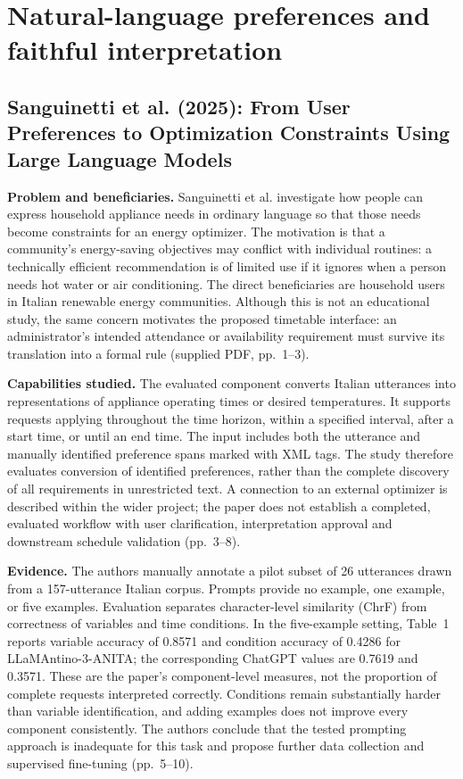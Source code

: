\documentclass[
  11pt,a4paper,oneside]{report}
\begin{document}
\section{Natural-language preferences and faithful interpretation}
\subsection{Sanguinetti et al. (2025): From User Preferences to Optimization Constraints Using Large Language Models}
\textbf{Problem and beneficiaries.} Sanguinetti et al. investigate how people can express household appliance needs in ordinary language so that those needs become constraints for an energy optimizer. The motivation is that a community's energy-saving objectives may conflict with individual routines: a technically efficient recommendation is of limited use if it ignores when a person needs hot water or air conditioning. The direct beneficiaries are household users in Italian renewable energy communities. Although this is not an educational study, the same concern motivates the proposed timetable interface: an administrator's intended attendance or availability requirement must survive its translation into a formal rule (supplied PDF, pp.~1--3).

\textbf{Capabilities studied.} The evaluated component converts Italian utterances into representations of appliance operating times or desired temperatures. It supports requests applying throughout the time horizon, within a specified interval, after a start time, or until an end time. The input includes both the utterance and manually identified preference spans marked with XML tags. The study therefore evaluates conversion of identified preferences, rather than the complete discovery of all requirements in unrestricted text. A connection to an external optimizer is described within the wider project; the paper does not establish a completed, evaluated workflow with user clarification, interpretation approval and downstream schedule validation (pp.~3--8).

\textbf{Evidence.} The authors manually annotate a pilot subset of 26 utterances drawn from a 157-utterance Italian corpus. Prompts provide no example, one example, or five examples. Evaluation separates character-level similarity (ChrF) from correctness of variables and time conditions. In the five-example setting, Table~1 reports variable accuracy of 0.8571 and condition accuracy of 0.4286 for LLaMAntino-3-ANITA; the corresponding ChatGPT values are 0.7619 and 0.3571. These are the paper's component-level measures, not the proportion of complete requests interpreted correctly. Conditions remain substantially harder than variable identification, and adding examples does not improve every component consistently. The authors conclude that the tested prompting approach is inadequate for this task and propose further data collection and supervised fine-tuning (pp.~5--10).
\end{document}
